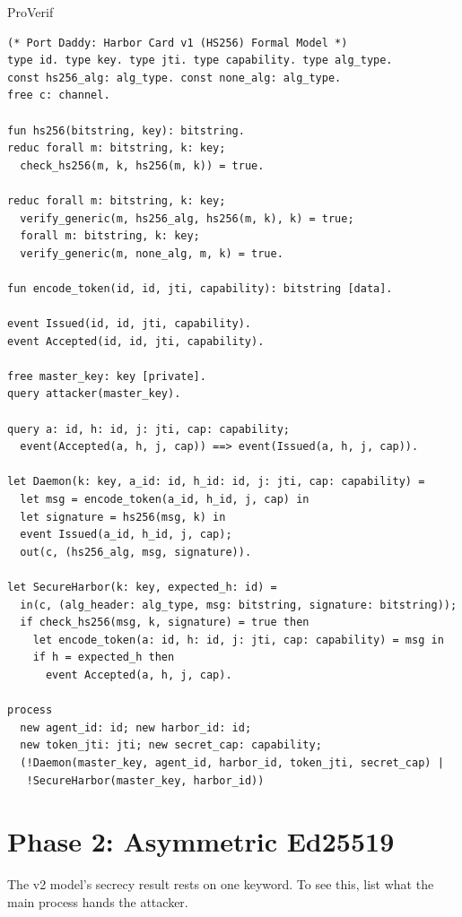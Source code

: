 \documentclass[11pt,a4paper]{article}
\theoremstyle{definition}
\begin{document}
\begin{pdlisting}{ProVerif}{}
\begin{lstlisting}[caption={\texttt{harbor\_card\_v1\_refined.pv}}]
(* Port Daddy: Harbor Card v1 (HS256) Formal Model *)
type id. type key. type jti. type capability. type alg_type.
const hs256_alg: alg_type. const none_alg: alg_type.
free c: channel.

fun hs256(bitstring, key): bitstring.
reduc forall m: bitstring, k: key; 
  check_hs256(m, k, hs256(m, k)) = true.

reduc forall m: bitstring, k: key; 
  verify_generic(m, hs256_alg, hs256(m, k), k) = true;
  forall m: bitstring, k: key; 
  verify_generic(m, none_alg, m, k) = true.

fun encode_token(id, id, jti, capability): bitstring [data].

event Issued(id, id, jti, capability).
event Accepted(id, id, jti, capability).

free master_key: key [private].
query attacker(master_key).

query a: id, h: id, j: jti, cap: capability;
  event(Accepted(a, h, j, cap)) ==> event(Issued(a, h, j, cap)).

let Daemon(k: key, a_id: id, h_id: id, j: jti, cap: capability) =
  let msg = encode_token(a_id, h_id, j, cap) in
  let signature = hs256(msg, k) in
  event Issued(a_id, h_id, j, cap);
  out(c, (hs256_alg, msg, signature)).

let SecureHarbor(k: key, expected_h: id) =
  in(c, (alg_header: alg_type, msg: bitstring, signature: bitstring));
  if check_hs256(msg, k, signature) = true then
    let encode_token(a: id, h: id, j: jti, cap: capability) = msg in
    if h = expected_h then
      event Accepted(a, h, j, cap).

process
  new agent_id: id; new harbor_id: id;
  new token_jti: jti; new secret_cap: capability;
  (!Daemon(master_key, agent_id, harbor_id, token_jti, secret_cap) |
   !SecureHarbor(master_key, harbor_id))
\end{lstlisting}
\end{pdlisting}

\section{Phase 2: Asymmetric Ed25519}\label{app:phase2}

The v2 model's secrecy result rests on one keyword. To see this, list what the main process hands the attacker.
\end{document}
